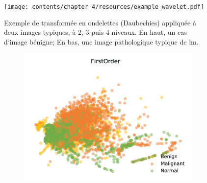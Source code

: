 \begin{figure}[H]
    \centering
    \texttt{[image: contents/chapter\_4/resources/example\_wavelet.pdf]}
    \caption{Exemple de transformée en ondelettes (Daubechies) appliquée à deux images typiques, à 2, 3 puis 4 niveaux. En haut, un cas d'image bénigne; En bas, une image pathologique typique de \gls{lm}.}
    \label{fig:example_wavelet}
\end{figure}\par

\begin{figure}[H]
    \centering
    \begin{subfigure}{.5\textwidth}
      \includegraphics[width=\textwidth]{contents/chapter_4/resources/visualisation_spatial_first.png}
    \end{subfigure}
    

\end{figure}
